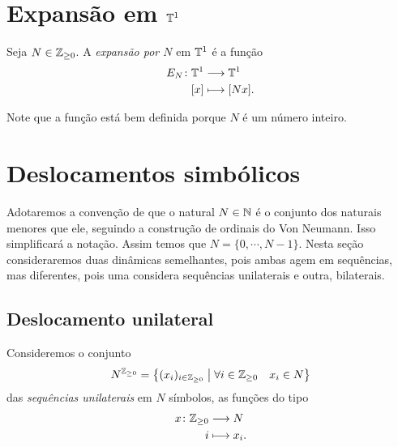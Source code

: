 
\section{Expansão em \ensuremath{\T^1}}

\begin{definition}
Seja $N \in \mathbb{Z}_{\geq 0}$. A \emph{expansão por $N$} em $\mathbb{T}^1$ é a função
	\begin{align*}
	{E_N}\colon {\mathbb{T}^1} &\longrightarrow {\mathbb{T}^1} \\{[x]} &\longmapsto [Nx].
	\end{align*}
\end{definition}

Note que a função está bem definida porque $N$ é um número inteiro.


\section{Deslocamentos simbólicos}

Adotaremos a convenção de que o natural $N \in \mathbb{N}$ é o conjunto dos naturais menores que ele, seguindo a construção de ordinais do Von Neumann. Isso simplificará a notação. Assim temos que $N = \{0,\cdots,N-1\}$. Nesta seção consideraremos duas dinâmicas semelhantes, pois ambas agem em sequências, mas diferentes, pois uma considera sequências unilaterais e outra, bilaterais.

\subsection{Deslocamento unilateral}

Consideremos o conjunto
	\begin{equation*}
	N^{\mathbb{Z}_{\geq 0}} = \left\{{(x_i)_{i \in \mathbb{Z}_{\geq 0}}}\;\middle\vert\;{\forall i \in \mathbb{Z}_{\geq 0} \quad x_i \in N}\right\}
	\end{equation*}
das \emph{sequências unilaterais} em $N$ símbolos, as funções do tipo
	\begin{align*}
	{x}\colon {\mathbb{Z}_{\geq 0}} &\longrightarrow {N} \\{i} &\longmapsto x_i.
	\end{align*}

